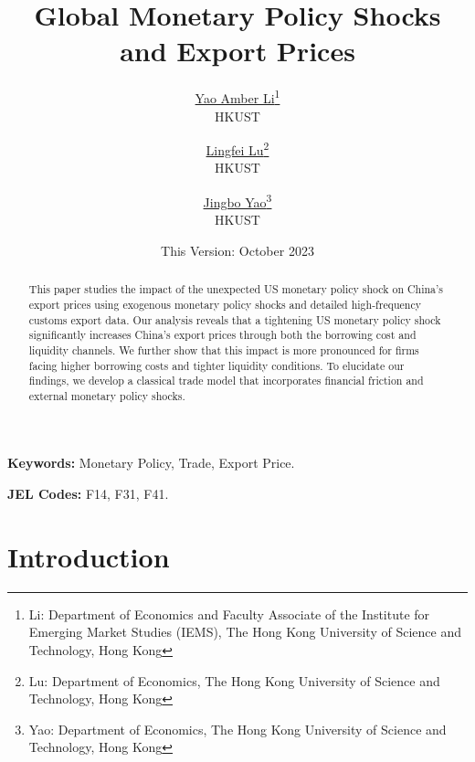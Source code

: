 

\linespread{1.2}
\geometry{a4paper,scale=0.75}
\setlength{\parskip}{0.5em}




\title{\Large \textbf{Global Monetary Policy Shocks and Export Prices}}

\author{\large \href{http://yaoli.people.ust.hk/}{Yao Amber Li}\thanks{Li: Department of Economics and Faculty Associate of the Institute for Emerging Market Studies (IEMS), The Hong Kong University of Science and Technology, Hong Kong}\\ \large{HKUST}
\medskip
\and \href{}{Lingfei Lu}\thanks{Lu: Department of Economics, The Hong Kong University of Science and Technology, Hong Kong } \\ \large{HKUST}
\medskip
\and \href{}{Jingbo Yao}\thanks{Yao: Department of Economics, The Hong Kong University of Science and Technology, Hong Kong} \\ \large{HKUST}
}
\date{This Version: October 2023}

\maketitle

\begin{abstract}
This paper studies the impact of the unexpected US monetary policy shock on China's export prices using exogenous monetary policy shocks and detailed high-frequency customs export data. Our analysis reveals that a tightening US monetary policy shock significantly increases China's export prices through both the borrowing cost and liquidity channels. We further show that this impact is more pronounced for firms facing higher borrowing costs and tighter liquidity conditions. To elucidate our findings, we develop a classical trade model that incorporates financial friction and external monetary policy shocks.

\end{abstract}

\textbf{Keywords:} Monetary Policy, Trade, Export Price.

\textbf{JEL Codes:} F14, F31, F41.
\newpage

\tableofcontents

\section{Introduction}


